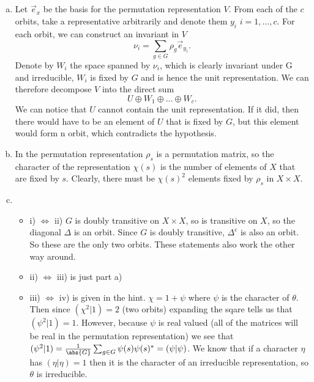 \documentclass[a4paper, oneside, 10pt]{article}
\numberwithin{Answer}{section}
\numberwithin{Exercise}{section}
\begin{document}
\subsection{}
\begin{enumerate}[a)]
    \item Let $\vec{e}_x$ be the basis for the permutation representation $V$. 
        From each of the $c$ orbits, take a representative arbitrarily and denote them
        $y_i$ $i=1, \dots, c$. For each orbit, we can construct an invariant in $V$
        \[
            \nu_i = \sum_{g\in G} \rho_g \vec{e}_{y_i}.
        \]
        Denote by $W_i$ the space spanned by $\nu_i$, which is clearly invariant under G and irreducible,
        $W_i$ is fixed by $G$ and is hence the unit representation.
        We can therefore decompose $V$ into the direct sum
        \[
            U \oplus W_1 \oplus \dots \oplus W_c.
        \]
        We can notice that $U$ cannot contain the unit representation. If it did, then
        there would have to be an element of $U$ that is fixed by $G$, but this element would 
        form n orbit, which contradicts the hypothesis.
    \item In the permutation representation $\rho_s$ is a permutation matrix, so the character of
        the representation $\chi(s)$ is the number of elements of $X$ that are fixed by $s$. 
        Clearly, there must be $\chi(s)^2$ elements fixed by $\rho_s$ in $X\times X$.
    \item
    \begin{itemize}
        \item i) $\iff$ ii) $G$ is doubly transitive on $X\times X$, so is transitive on $X$, so the diagonal $\Delta$ is an orbit.
            Since $G$ is doubly transitive, $\Delta^\text{c}$ is also an orbit. So these are the only two orbits. 
            These statements also work the other way around. 
        \item ii) $\iff$ iii) is just part a)
        \item iii) $\iff$ iv) is given in the hint. $\chi = 1 + \psi$ where $\psi$ is the character of $\theta$.
            Then since $(\chi^2 | 1) = 2$ (two orbits) expanding the sqare tells us that $(\psi^2|1) = 1$. 
            However, because $\psi$ is real valued (all of the matrices will be real in the permutation representation)
            we see that $(\psi^2|1) = \frac1{\abs{G}} \sum_{g\in G} \psi(s) \psi(s)^* = (\psi|\psi)$. 
            We know that if a character $\eta$ has $(\eta | \eta) = 1$ then it is the character of an irreducible representation,
            so $\theta$ is irreducible.
    \end{itemize}
\end{enumerate}





\nocite{*}


\end{document}

